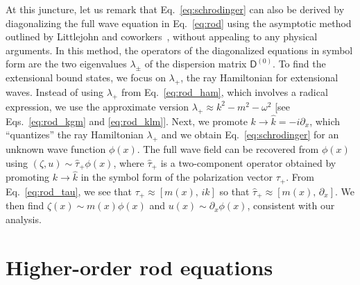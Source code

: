 At this juncture, let us remark that Eq.~\eqref{eq:schrodinger} can also be derived by diagonalizing the full wave equation in Eq.~\eqref{eq:rod} using the asymptotic method outlined by Littlejohn and coworkers~\cite{littlejohn1991,littlejohn1991a,weigert1993}, without appealing to any physical arguments.
In this method, the operators of the diagonalized equations in symbol form are the two eigenvalues $\lambda_{\pm}$ of the dispersion matrix $\mathsf{D}^{(0)}$.
To find the extensional bound states, we focus on $\lambda_{+}$, the ray Hamiltonian for extensional waves.
Instead of using $\lambda_{+}$ from Eq.~\eqref{eq:rod_ham}, which involves a radical expression, we use the approximate version $\lambda_{+} \approx k^{2} - m^{2} - \omega^{2}$ [see Eqs.~\eqref{eq:rod_kgm} and \eqref{eq:rod_klm}].
Next, we promote $k \to \hat{k} = -i\partial_{x}$, which ``quantizes'' the ray Hamiltonian $\lambda_{+}$ and we obtain Eq.~\eqref{eq:schrodinger} for an unknown wave function $\phi(x)$.
The full wave field can be recovered from $\phi(x)$ using $(\zeta, u) \sim \hat{\tau}_{+}\phi(x)$, where $\hat{\tau}_{+}$ is a two-component operator obtained by promoting $k \to \hat{k}$ in the symbol form of the polarization vector $\tau_{+}$.
From Eq.~\eqref{eq:rod_tau}, we see that $\tau_{+} \approx [m(x),\, ik]$ so that $\hat{\tau}_{+} \approx [m(x),\, \partial_{x}]$.
We then find $\zeta(x) \sim m(x)\phi(x)$ and $u(x) \sim \partial_{x}\phi(x)$, consistent with our analysis.

\section{Higher-order rod equations}
\label{sec:rod_ho}

